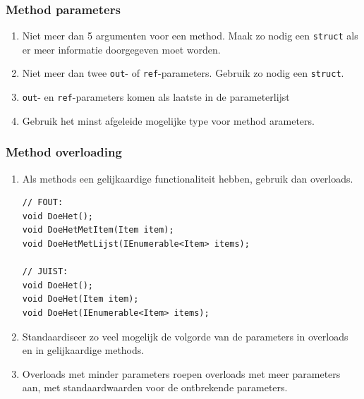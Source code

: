 \documentclass[a4paper,11pt]{article}
\begin{document}
\subsubsection{Method parameters}
\begin{enumerate}[resume]
\item Niet meer dan 5 argumenten voor een method.  Maak zo nodig een \lstinline !struct! als
er meer informatie doorgegeven moet worden.
\item Niet meer dan twee \lstinline !out!- of 
\lstinline !ref!-parameters.  Gebruik zo nodig een \lstinline !struct!.
\item \lstinline !out!- en \lstinline !ref!-parameters komen als laatste
in de parameterlijst
\item Gebruik het minst afgeleide mogelijke type voor method arameters.
\end{enumerate}

\subsubsection{Method overloading}
\begin{enumerate}[resume]
\item Als methods een gelijkaardige functionaliteit hebben, gebruik dan
overloads.
\begin{lstlisting}
// FOUT:
void DoeHet();
void DoeHetMetItem(Item item);
void DoeHetMetLijst(IEnumerable<Item> items);

// JUIST:
void DoeHet();
void DoeHet(Item item);
void DoeHet(IEnumerable<Item> items);
\end{lstlisting}
\item Standaardiseer zo veel mogelijk de volgorde van de parameters in
overloads en in gelijkaardige methods.
\item Overloads met minder parameters roepen overloads met meer
parameters aan, met standaardwaarden voor de ontbrekende parameters.

\end{enumerate}
\end{document}
